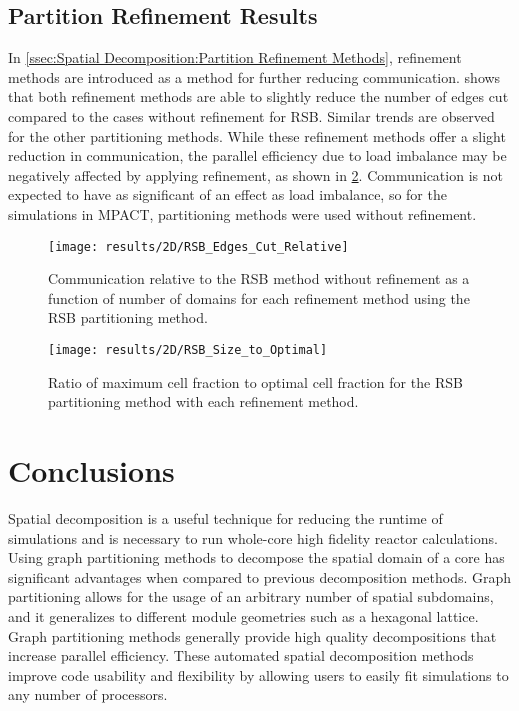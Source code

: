 {{    \subsection{Partition Refinement Results}{\label{ssec:Spatial Decomposition:Partition Refinement Results}
      In \cref{ssec:Spatial Decomposition:Partition Refinement Methods}, refinement methods are introduced as a method for further reducing communication.
       shows that both refinement methods are able to slightly reduce the number of edges cut compared to the cases without refinement for \ac{RSB}.
      Similar trends are observed for the other partitioning methods.
      While these refinement methods offer a slight reduction in communication, the parallel efficiency due to load imbalance may be negatively affected by applying refinement, as shown in \cref{fig:Spatial Decomposition:RSB Refinement Balance}.
      Communication is not expected to have as significant of an effect as load imbalance, so for the simulations in MPACT, partitioning methods were used without refinement.

      \begin{figure}
        \centering
        \texttt{[image: results/2D/RSB\_Edges\_Cut\_Relative]}
        \caption{Communication relative to the \ac{RSB} method without refinement as a function of number of domains for each refinement method using the \ac{RSB} partitioning method.\label{fig:Spatial Decomposition:2D RSB Refinement}}
      \end{figure}

      \begin{figure}
        \centering
        \texttt{[image: results/2D/RSB\_Size\_to\_Optimal]}
        \caption{Ratio of maximum cell fraction to optimal cell fraction for the \ac{RSB} partitioning method with each refinement method. \label{fig:Spatial Decomposition:RSB Refinement Balance}}
      \end{figure}
    }
  }
  \section{Conclusions}{\label{sec:Spatial Decomposition:Conclusions}
    Spatial decomposition is a useful technique for reducing the runtime of simulations and is necessary to run whole-core high fidelity reactor calculations.
    Using graph partitioning methods to decompose the spatial domain of a core has significant advantages when compared to previous decomposition methods.
    Graph partitioning allows for the usage of an arbitrary number of spatial subdomains, and it generalizes to different module geometries such as a hexagonal lattice.
    Graph partitioning methods generally provide high quality decompositions that increase parallel efficiency.
    These automated spatial decomposition methods improve code usability and flexibility by allowing users to easily fit simulations to any number of processors.

}}
